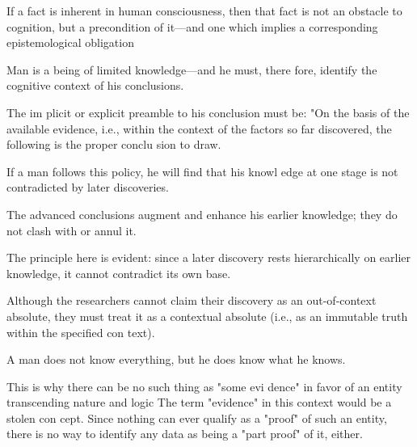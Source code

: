         If a fact is inherent in human consciousness, then that fact is not an obstacle to cognition, but a precondition of it—and one which implies a corresponding epistemological obligation

        Man is a being of limited knowledge—and he must, there fore, identify the cognitive context of his conclusions.

        The im plicit or explicit preamble to his conclusion must be: "On the basis of the available evidence, i.e., within the context of the factors so far discovered, the following is the proper conclu sion to draw.

        If a man follows this policy, he will find that his knowl edge at one stage is not contradicted by later discoveries.

        The advanced conclusions augment and enhance his earlier knowledge; they do not clash with or annul it.

        The principle here is evident: since a later discovery rests hierarchically on earlier knowledge, it cannot contradict its own base.
        
        Although the researchers cannot claim their discovery as an out-of-context absolute, they must treat it as a contextual absolute (i.e., as an immutable truth within the specified con text).

        A man does not know everything, but he does know what he knows.
        
        This is why there can be no such thing as "some evi dence" in favor of an entity transcending nature and logic The term "evidence" in this context would be a stolen con cept. Since nothing can ever qualify as a "proof" of such an entity, there is no way to identify any data as being a "part proof" of it, either.